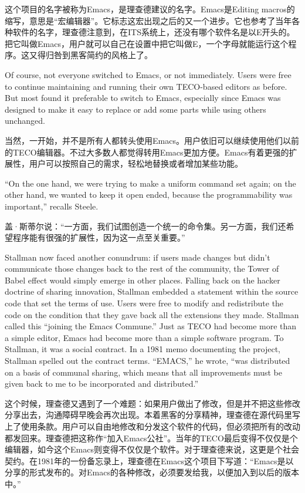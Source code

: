 \ifdefined\chs
这个项目的名字被称为Emacs，是理查德建议的名字。Emacs是Editing macros的缩写，意思是“宏编辑器”。它标志这宏出现之后的又一个进步。它也参考了当年各种软件的名字，理查德注意到，在ITS系统上，还没有哪个软件名是以E开头的。把它叫做Emacs，用户就可以自己在设置中把它叫做E，一个字母就能运行这个程序。这又得归咎到黑客简约的风格上了。
\fi

\ifdefined\eng
Of course, not everyone switched to Emacs, or not immediately.  Users were free to continue maintaining and running their own TECO-based editors as before.  But most found it preferable to switch to Emacs, especially since Emacs was designed to make it easy to replace or add some parts while using others unchanged.
\fi

\ifdefined\chs
当然，一开始，并不是所有人都转头使用Emacs。用户依旧可以继续使用他们以前的TECO编辑器。不过大多数人都觉得转用Emacs更加方便。Emacs有着更强的扩展性，用户可以按照自己的需求，轻松地替换或者增加某些功能。
\fi

\ifdefined\eng
``On the one hand, we were trying to make a uniform command set again; on the other hand, we wanted to keep it open ended, because the programmability was important,'' recalls Steele.
\fi

\ifdefined\chs
盖·斯蒂尔说：“一方面，我们试图创造一个统一的命令集。另一方面，我们还希望程序能有很强的扩展性，因为这一点至关重要。”
\fi

\ifdefined\eng
Stallman now faced another conundrum: if users made changes but didn't communicate those changes back to the rest of the community, the Tower of Babel effect would simply emerge in other places. Falling back on the hacker doctrine of sharing innovation, Stallman embedded a statement within the source code that set the terms of use. Users were free to modify and redistribute the code on the condition that they gave back all the extensions they made. Stallman called this ``joining the Emacs Commune.'' Just as TECO had become more than a simple editor, Emacs had become more than a simple software program. To Stallman, it was a social contract. In a 1981 memo documenting the project, Stallman spelled out the contract terms. ``EMACS,'' he wrote, ``was distributed on a basis of communal sharing, which means that all improvements must be given back to me to be incorporated and distributed.''
\fi

\ifdefined\chs
这个时候，理查德又遇到了一个难题：如果用户做出了修改，但是并不把这些修改分享出去，沟通障碍早晚会再次出现。本着黑客的分享精神，理查德在源代码里写上了使用条款。用户可以自由地修改和分发这个软件的代码，但必须把所有的改动都发回来。理查德把这称作“加入Emacs公社”。当年的TECO最后变得不仅仅是个编辑器，如今这个Emacs则变得不仅仅是个软件。对于理查德来说，这更是个社会契约。在1981年的一份备忘录上，理查德在Emacs这个项目下写道：“Emacs是以分享的形式发布的。对Emacs的各种修改，必须要发给我，以便加入到以后的版本中。”
\fi

